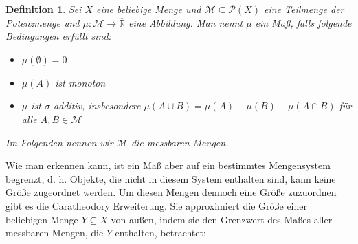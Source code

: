 \documentclass[hidelinks]{article}
\newtheorem{definition}[satz]{Definition}
\begin{document}
    \begin{definition}
        Sei $X$ eine beliebige Menge  und $\mathcal{M} \subseteq \mathcal P(X)$ eine Teilmenge der Potenzmenge und $\mu:\mathcal{M} \to \overline{\mathbb{R}}$
        eine Abbildung. Man nennt $\mu$ ein Maß, falls folgende Bedingungen erfüllt sind:
        \begin{itemize}
            \item $\mu(\emptyset) = 0$

            \item $\mu(A)$ ist monoton

            \item $\mu$ ist $\sigma$-additiv, insbesondere $\mu(A\cup B)=\mu(A)+\mu(B)-\mu(A\cap B)$ für alle $A, B\in\mathcal{M}$
        \end{itemize}
        Im Folgenden nennen wir $\mathcal M$ die messbaren Mengen.
    \end{definition}
    Wie man erkennen kann, ist ein Maß aber auf ein bestimmtes Mengensystem begrenzt, d. h. Objekte, die nicht in diesem System enthalten sind, kann keine Größe zugeordnet werden. 
    Um diesen Mengen dennoch eine Größe zuzuordnen gibt es die Caratheodory Erweiterung. Sie approximiert die Größe einer beliebigen Menge $Y \subseteq X$ von außen, indem sie den Grenzwert des Maßes aller messbaren Mengen, die $Y$ enthalten, betrachtet: 
\end{document}
